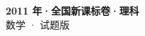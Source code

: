 \documentclass[zihao=-4, a4paper]{ctexart}
\begin{document}
\begin{center}
  {\Large\bfseries 2011 年·全国新课标卷·理科}\\[4pt]
  {\large 数学 · 试题版}
\end{center}
\medskip
{}

\end{document}
